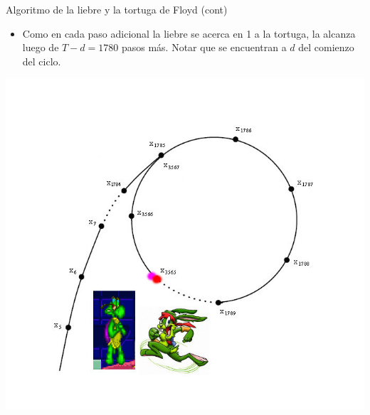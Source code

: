 \documentclass{beamer}
\begin{document}
\begin{frame}{Algoritmo de la liebre y la tortuga de Floyd (cont)}
    \begin{itemize}
    \item Como en cada paso adicional la liebre se acerca en 1 a la tortuga, la alcanza luego de $T-d = 1780$ pasos más. Notar que se encuentran a $d$ del comienzo del ciclo.
    \end{itemize}
    {\hfill \includegraphics[scale=0.35]{hare_tortoise_rho_cycle2.jpg} \hfill}
\end{frame}
\end{document}
